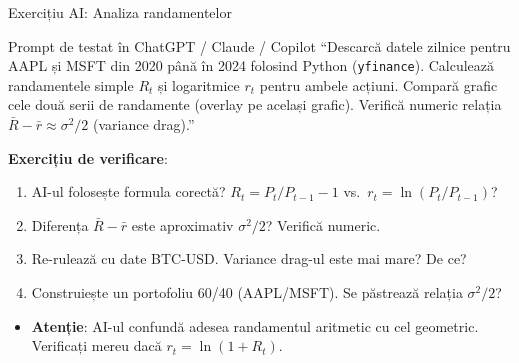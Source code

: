 \documentclass[9pt, aspectratio=169, t]{beamer}
\theoremstyle{definition}
\newenvironment{cminipage}[1]{%
    \par\noindent\hfill\begin{minipage}{#1}\ignorespaces
}{%
    \end{minipage}\hfill\null\par
}
\begin{document}
\begin{frame}[shrink=3]{Exercițiu AI: Analiza randamentelor}
    \begin{cminipage}{0.95\textwidth}
    \begin{block}{\footnotesize Prompt de testat în ChatGPT / Claude / Copilot}
        {\small
        ``Descarcă datele zilnice pentru AAPL și MSFT din 2020 până în 2024 folosind Python (\texttt{yfinance}).
        Calculează randamentele simple $R_t$ și logaritmice $r_t$ pentru ambele acțiuni.
        Compară grafic cele două serii de randamente (overlay pe același grafic).
        Verifică numeric relația $\bar{R} - \bar{r} \approx \sigma^2/2$ (variance drag).''
        }
    \end{block}
    \vspace{-1mm}
    {\small
    \textbf{Exercițiu de verificare}:
    \begin{enumerate}
        \item AI-ul folosește formula corectă? $R_t = P_t/P_{t-1} - 1$ vs.\ $r_t = \ln(P_t/P_{t-1})$?
        \item Diferența $\bar{R} - \bar{r}$ este aproximativ $\sigma^2/2$? Verifică numeric.
        \item Re-rulează cu date BTC-USD. Variance drag-ul este mai mare? De ce?
        \item Construiește un portofoliu 60/40 (AAPL/MSFT). Se păstrează relația $\sigma^2/2$?
    \end{enumerate}
    }
    \vspace{-1mm}
    \begin{alertblock}{}
        {\small
        \begin{itemize}\setlength{\itemsep}{0pt}
            \item \textbf{Atenție}: AI-ul confundă adesea randamentul aritmetic cu cel geometric. Verificați mereu dacă $r_t = \ln(1 + R_t)$.
        \end{itemize}
        }
    \end{alertblock}
    \end{cminipage}
\end{frame}
\end{document}

